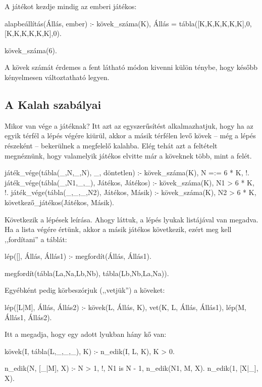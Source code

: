 A játékot kezdje mindig az emberi játékos:
\begin{program}
alapbeállítás(Állás, ember) :-
    kövek_száma(K),
    Állás = tábla([K,K,K,K,K,K],0,
                  [K,K,K,K,K,K],0).

kövek_száma(6).
\end{program}

A kövek számát érdemes a fent látható módon kivenni
külön ténybe, hogy később kényelmesen változtatható
legyen.

\subsection*{A Kalah szabályai}
Mikor van vége a játéknak? Itt azt az egyszerűsítést
alkalmazhatjuk, hogy ha az egyik térfél a lépés
végére kiürül, akkor a másik térfélen levő kövek --
még a lépés részeként -- bekerülnek a megfelelő
kalahba. Elég tehát azt a feltételt megnéznünk, hogy
valamelyik játékos elvitte már a köveknek több, mint
a felét.
\begin{program}
játék_vége(tábla(_,N,_,N), _, döntetlen) :-
    kövek_száma(K), N =:= 6 * K, !.
játék_vége(tábla(_,N1,_,_), Játékos, Játékos) :-
    kövek_száma(K), N1 > 6 * K, !.
játék_vége(tábla(_,_,_,N2), Játékos, Másik) :-
    kövek_száma(K), N2 > 6 * K,
    következő_játékos(Játékos, Másik).
\end{program}

Következik a lépések leírása. Ahogy láttuk, a lépés
lyukak listájával van megadva. Ha a lista végére
értünk, akkor a másik játékos következik, ezért meg
kell ,,fordítani'' a táblát:
\begin{program}
lép([], Állás, Állás1) :- megfordít(Állás, Állás1).

megfordít(tábla(La,Na,Lb,Nb), tábla(Lb,Nb,La,Na)).
\end{program}

Egyébként pedig körbeszórjuk (,,vetjük'') a köveket:
\begin{program}
lép([L|M], Állás, Állás2) :-
    kövek(L, Állás, K),
    vet(K, L, Állás, Állás1),
    lép(M, Állás1, Állás2).
\end{program}

Itt a  megadja, hogy egy adott lyukban
hány kő van:
\begin{program}
kövek(I, tábla(L,_,_,_), K) :- n_edik(I, L, K), K > 0.

n_edik(N, [_|M], X) :-
    N > 1, !, N1 is N - 1,
    n_edik(N1, M, X).
n_edik(1, [X|_], X).
\end{program}

